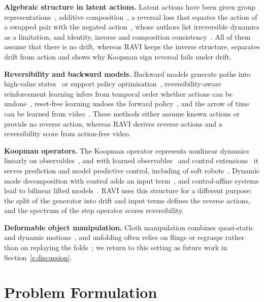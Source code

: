 \documentclass{jcse}
\newcommand{\method}{RAVI}
\begin{document}
\textbf{Algebraic structure in latent actions.}
Latent actions have been given group representations~\cite{keurti2023hae}, additive composition~\cite{wei2026aclam}, a reversal loss that equates the action of a swapped pair with the negated action~\cite{tang2026alam}, whose authors list irreversible dynamics as a limitation, and identity, inverse and composition consistency~\cite{wang2026groupactions}.
All of them assume that there is no drift, whereas {\method} keeps the inverse structure, separates drift from action and shows why Koopman sign reversal fails under drift.

\textbf{Reversibility and backward models.}
Backward models generate paths into high-value states~\cite{goyal2019recall} or support policy optimisation~\cite{lai2020bmpo}, reversibility-aware reinforcement learning infers from temporal order whether actions can be undone~\cite{grinsztajn2021reversibility}, reset-free learning undoes the forward policy~\cite{eysenbach2018leave}, and the arrow of time can be learned from video~\cite{wei2018arrow}.
These methods either assume known actions or provide no reverse action, whereas {\method} derives reverse actions and a reversibility score from action-free video.

\textbf{Koopman operators.}
The Koopman operator represents nonlinear dynamics linearly on observables~\cite{koopman1931,mezic2005spectral}, and with learned observables~\cite{lusch2018deep} and control extensions~\cite{korda2018koopman,bruder2021bilinear,brunton2022modern} it serves prediction and model predictive control, including of soft robots~\cite{bruder2019soft}.
Dynamic mode decomposition with control adds an input term~\cite{proctor2016dmdc}, and control-affine systems lead to bilinear lifted models~\cite{goswami2017global,bruder2021bilinear}.
{\method} uses this structure for a different purpose: the split of the generator into drift and input terms defines the reverse actions, and the spectrum of the step operator scores reversibility.

\textbf{Deformable object manipulation.}
Cloth manipulation combines quasi-static and dynamic motions~\cite{lin2020softgym,lin2021vcd}, and unfolding often relies on flings or regrasps rather than on replaying the folds~\cite{ha2021flingbot,avigal2022speedfolding}; we return to this setting as future work in Section~\ref{s:discussion}.

\section{Problem Formulation} \label{s:problem}
\end{document}
